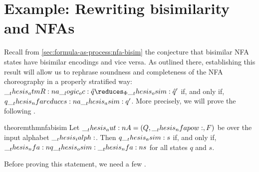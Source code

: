\section{Example: Rewriting bisimilarity and \acsp*{NFA}}\label{sec:ordered-bisimilarity:nfa}

Recall from \cref{sec:formula-as-process:nfa-bisim} the conjecture that bisimilar \ac{NFA} states have bisimilar encodings and vice versa.
As outlined there, establishing this result will allow us to rephrase soundness and completeness of the \ac{NFA} choreography in a properly stratified way: $\atmR{a} \oc \defp{q} \reduces_{\orsig}\osim \defp{q}'$ if, and only if, $q \nfareduces[a]\asim q'$.
More precisely, we will prove the following .
\begin{restatable*}[
  label=thm:nfa-bisim-osim
]{theorem}{thmnfabisim}
  Let $\__thesis_aut:n {A} = (Q, \__thesis_nfapow:, F)$ be  over the input alphabet $\__thesis_ialph:$.
  Then $q \__thesis_asim: s$ if, and only if, $\__thesis_nfa:n {q} \__thesis_osim: \__thesis_nfa:n {s}$ for all states $q$ and $s$.
\end{restatable*}
\noindent
Before proving this statement, we need a few .
%

%

